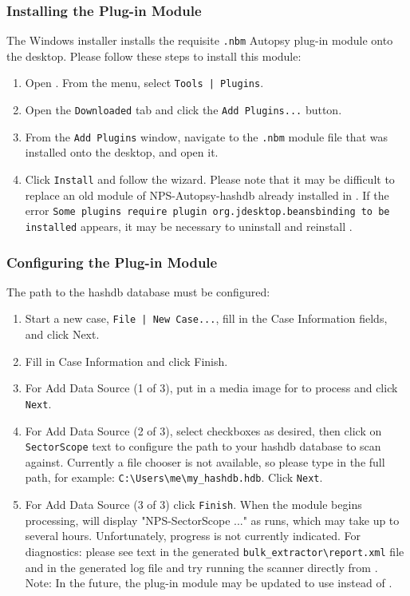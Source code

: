 \documentclass[11pt,fleqn]{article} %
\begin{document}
\subsubsection{Installing the \sscope \aut Plug-in Module}
The \sscope Windows installer installs the requisite \verb+.nbm+ Autopsy plug-in module onto the desktop. Please follow these steps to install this module:
\begin{enumerate}
\item Open \aut. From the \aut menu, select \verb+Tools | Plugins+.
\item Open the \verb+Downloaded+ tab and click the \verb+Add Plugins...+ button.
\item From the \verb+Add Plugins+ window, navigate to the \verb+.nbm+ module file that was installed onto the desktop, and open it.
\item Click \verb+Install+ and follow the wizard. Please note that it may be difficult to replace an old module of NPS-Autopsy-hashdb already installed in \aut. If the error \verb+Some plugins require plugin org.jdesktop.beansbinding to be installed+ appears, it may be necessary to uninstall and reinstall \aut.
\end{enumerate}

\subsubsection{Configuring the \sscope \aut Plug-in Module}
The path to the hashdb database must be configured:
\begin{enumerate}
\item Start a new case, \verb+File | New Case...+, fill in the Case Information fields, and click Next.
\item Fill in Case Information and click Finish.
\item For Add Data Source (1 of 3), put in a media image for \aut to process and click \verb+Next+.
\item For Add Data Source (2 of 3), select checkboxes as desired, then click on \verb+SectorScope+ text to configure the path to your hashdb database to scan against. Currently a file chooser is not available, so please type in the full path, for example: \verb+C:\Users\me\my_hashdb.hdb+. Click \verb+Next+.
\item For Add Data Source (3 of 3) click \verb+Finish+. When the \sscope module begins processing, \aut will display "NPS-SectorScope ..." as \bulk runs, which may take up to several hours. Unfortunately, \bulk progress is not currently indicated. For diagnostics: please see text in the generated \verb+bulk_extractor\report.xml+ file and in the generated log file and try running the \bulk scanner directly from \sscope.\\

Note: In the future, the \sscope \aut plug-in module may be updated to use \hdb instead of \bulk.
\end{enumerate}
\end{document}
